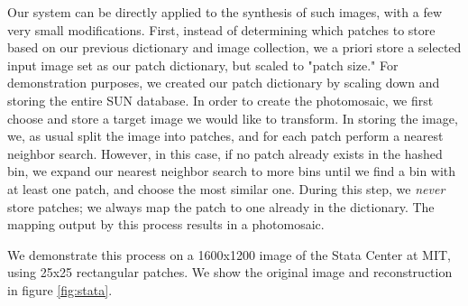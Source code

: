 Our system can be directly applied to the synthesis of such images, with a few very small modifications.  First, instead of determining which patches to store based on our previous dictionary and image collection, we a priori store a selected input image set as our patch dictionary, but scaled to "patch size."  For demonstration purposes, we created our patch dictionary by scaling down and storing the entire SUN database.  In order to create the photomosaic, we first choose and store a target image we would like to transform.  In storing the image, we, as usual split the image into patches, and for each patch perform a nearest neighbor search.  However, in this case, if no patch already exists in the hashed bin, we expand our nearest neighbor search to more bins until we find a bin with at least one patch, and choose the most similar one.  During this step, we \emph{never} store patches; we always map the patch to one already in the dictionary.  The mapping output by this process results in a photomosaic.

We demonstrate this process on a 1600x1200 image of the Stata Center at MIT, using 25x25 rectangular patches.  We show the original image and reconstruction in figure \ref{fig:stata}.

